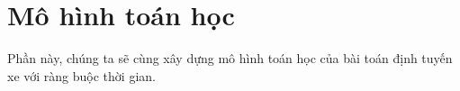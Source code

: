 \chapter{Mô hình toán học}
Phần này, chúng ta sẽ cùng xây dựng mô hình toán học của bài toán định tuyến xe với ràng buộc thời gian. \cite{griersonRH}